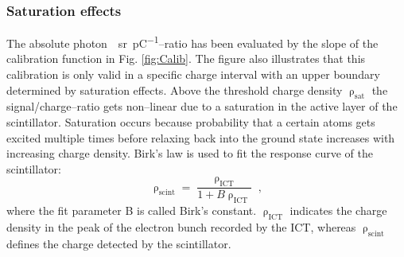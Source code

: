 \documentclass[%
reprint,
amsmath,
amssymb,
aip,
rsi, 
numerical,
floatfix,
]{revtex4-1}
\begin{document}
\subsubsection{\label{Se}Saturation effects}
The absolute \si{photon \per \steradian \per \pico\coulomb}--ratio has been evaluated by the slope of the calibration function in Fig. \ref{fig:Calib}. 
The figure also illustrates that this calibration is only valid in a specific charge interval with an upper boundary determined by saturation effects. 
Above the threshold charge density $\uprho_{\text{sat}}$ the signal/charge--ratio gets non--linear due to a saturation in the active layer of the scintillator.
Saturation occurs because probability that a certain atoms gets excited multiple times before relaxing back into the ground state increases with increasing charge density.
Birk’s law is used to fit the response curve of the scintillator:
\begin{equation}
\uprho_{\text{scint}} = \frac{\uprho_{\text{ICT}}}{1+B\uprho_{\text{ICT}}}{\;,}
\label{eq:birk}
\end{equation}
where the fit parameter B is called Birk's constant.
$\uprho_{\text{ICT}}$ indicates the charge density in the peak of the electron bunch recorded by the ICT, whereas $\uprho_{\text{scint}}$ defines the charge detected by the scintillator.
\end{document}
